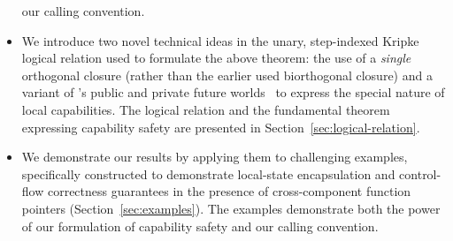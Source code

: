 \documentclass[format=acmsmall, review=true, screen=true]{acmart}
\renewcommand{\sectionname}{Section}
\newcommand\lau[1]{{\color{purple} \sf \footnotesize {LS: #1}}\\}
\renewcommand\lau[1]{}
\begin{document}
\begin{itemize}
  our calling convention.
\item We introduce two novel technical ideas in the unary, step-indexed Kripke
  logical relation used to formulate the above theorem: the use of a
  \emph{single} orthogonal closure (rather than the earlier used biorthogonal
  closure) and a variant of \citet{Dreyer:jfp12}'s public and private future
  worlds~\citep{Dreyer:jfp12} to express the special nature of local
  capabilities. The logical relation and the fundamental theorem expressing
  capability safety are presented in \sectionname~\ref{sec:logical-relation}.
\item We demonstrate our results by applying them to challenging examples,
  specifically constructed to demonstrate local-state encapsulation and
  control-flow correctness guarantees in the presence of cross-component
  function pointers (\sectionname~\ref{sec:examples}). The examples demonstrate both
  the power of our formulation of capability safety and our calling convention.
\end{itemize}
\end{document}
